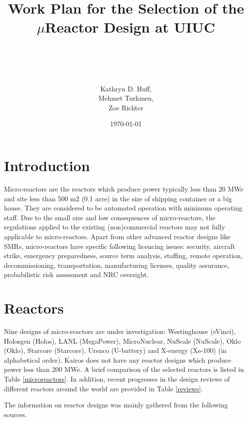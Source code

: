 \documentclass[10pt,a4paper]{article}
\begin{document}
\title{Work Plan for the Selection of the $\mu$Reactor Design at UIUC\\}
\author{\\ \\ \\ \\ Kathryn D. Huff,\\
Mehmet Turkmen,\\
Zoe Richter}
\date{\today}
\maketitle

\pagebreak
\tableofcontents


\printglossary


\pagebreak
\section{Introduction}
Micro-reactors are the reactors which produce power typically less than 20 MWe and site less than 500 m2 (0.1 acre) in the size of shipping container or a big house. They are considered to be automated operation with minimum operating staff. Due to the small size and low consequences of micro-reactors, the regulations applied to the existing (non)commercial reactors may not fully applicable to micro-reactors. Apart from other advanced reactor designs like \gls{SMR}s, micro-reactors have specific following licencing issues: security, aircraft strike, emergency preparedness, source term analysis, staffing, remote operation, decommissioning, transportation, manufacturing licenses, quality assurance, probabilistic risk assessment and \gls{NRC} oversight.

\section{Reactors} \label{sec:reactors}
Nine designs of micro-reactors are under investigation: Westinghouse (eVinci), Holosgen (Holos), \gls{LANL} (MegaPower), MicroNuclear, NuScale (NuScale), Oklo (Oklo), Starcore (Starcore), Urenco (U-battery) and X-energy (Xe-100) (in alphabetical order). Kairos does not have any reactor designs which produce power less than 200 MWe. A brief comparison of the selected reactors is listed in Table \ref{microreactors}. In addition, recent progresses in the design reviews of different reactors around the world are provided in Table \ref{reviews}. 

The information on reactor designs was mainly gathered from the following sources.
\end{document}
